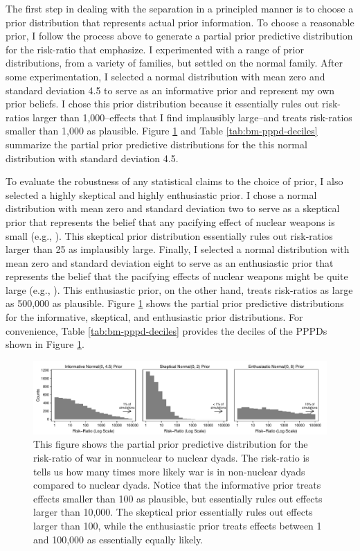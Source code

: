 \documentclass[12pt]{article}
\begin{document}
The first step in dealing with the separation in a principled manner is to choose a prior distribution that represents actual prior information. To choose a reasonable prior, I follow the process above to generate a partial prior predictive distribution for the risk-ratio that \cite{BellMiller2015} emphasize. I experimented with a range of prior distributions, from a variety of families, but settled on the normal family. After some experimentation, I selected a normal distribution with mean zero and standard deviation 4.5 to serve as an informative prior and represent my own prior beliefs. I chose this prior distribution because it essentially rules out risk-ratios larger than 1,000--effects that I find implausibly large--and treats risk-ratios smaller than 1,000 as plausible. Figure \ref{fig:bm-pppd-hist} and Table \ref{tab:bm-pppd-deciles} summarize the partial prior predictive distributions for the this normal distribution with standard deviation 4.5.

To evaluate the robustness of any statistical claims to the choice of prior, I also selected a highly skeptical and highly enthusiastic prior. I chose a normal distribution with mean zero and standard deviation two to serve as a skeptical prior that represents the belief that any pacifying effect of nuclear weapons is small (e.g., \citealt{Mueller1988}). This skeptical prior distribution essentially rules out risk-ratios larger than 25 as implausibly large. Finally, I selected a normal distribution with mean zero and standard deviation eight to serve as an enthusiastic prior that represents the belief that the pacifying effects of nuclear weapons might be quite large (e.g., \citealt{Mearsheimer1993}). This enthusiastic prior, on the other hand, treats risk-ratios as large as 500,000 as plausible. 
Figure \ref{fig:bm-pppd-hist} shows the partial prior predictive distributions for the informative, skeptical, and enthusiastic prior distributions. For convenience, Table \ref{tab:bm-pppd-deciles} provides the deciles of the PPPDs shown in Figure \ref{fig:bm-pppd-hist}. 

\begin{figure}[H]
\begin{center}
\includegraphics[scale = .8]{figs/bm-pppd-hist.pdf}
\caption{This figure shows the partial prior predictive distribution for the risk-ratio of war in nonnuclear to nuclear dyads. The risk-ratio is tells us how many times more likely war is in non-nuclear dyads compared to nuclear dyads. Notice that the informative prior treats effects smaller than 100 as plausible, but essentially rules out effects larger than 10,000. The skeptical prior essentially rules out effects larger than 100, while the enthusiastic prior treats effects between 1 and 100,000 as essentially equally likely.}\label{fig:bm-pppd-hist}
\end{center}
\end{figure}
\end{document}
